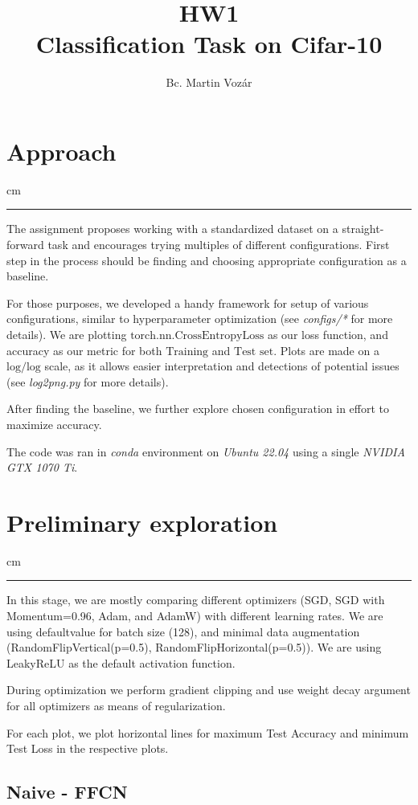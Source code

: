 \documentclass[12pt,a4paper]{article}
\date{}
\title{HW1 \\ Classification Task on Cifar-10}
\author{Bc. Martin Vozár}
\newcommand {\sectionrule}{\vskip -0.9 cm
\color {mygray} \rule [0 cm] {17 cm}{0.1 mm} \color {black}}
\begin{document}
\maketitle

\section{Approach}
\sectionrule

The assignment proposes working with a standardized dataset on a 
straight-forward task and encourages trying multiples of different
configurations. First step in the process should be finding and choosing
appropriate configuration as a baseline.

For those purposes, we developed a handy framework for setup
of various configurations, similar to hyperparameter optimization
(see \emph{configs/*} for more details).
We are plotting $\text{torch.nn.CrossEntropyLoss}$ as our loss function,
and accuracy as our metric for both $\text{Training}$ and $\text{Test set}$.
Plots are made on a $\text{log}/\text{log}$
scale, as it allows easier interpretation and detections of potential
issues (see \emph{log2png.py} for more details).

After finding the baseline, we further explore chosen configuration
in effort to maximize accuracy.

The code was ran in \emph{conda} environment on \emph{Ubuntu 22.04} using
a single \emph{NVIDIA GTX 1070 Ti}. 

\section{Preliminary exploration}
\sectionrule

In this stage, we are mostly comparing different optimizers 
(SGD, SGD with Momentum=0.96, Adam, and AdamW) with
different learning rates. We are using defaultvalue for batch size
(128), and minimal data augmentation (RandomFlipVertical(p=0.5),
RandomFlipHorizontal(p=0.5)). We are using LeakyReLU as the default
activation function.

During optimization we perform gradient clipping and use
weight decay argument for all optimizers as means of regularization.

For each plot, we plot horizontal lines for maximum Test Accuracy
and minimum Test Loss in the respective plots.

\subsection{Naive - FFCN}
\end{document}
